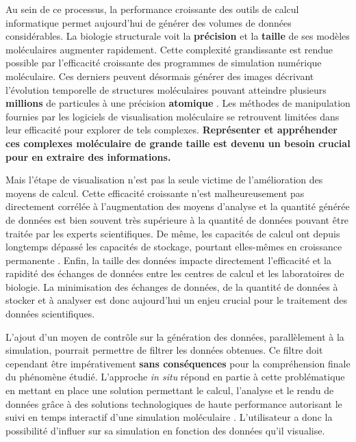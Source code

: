 Au sein de ce processus, la performance croissante des outils de calcul informatique permet aujourd'hui de générer des volumes de données considérables. La biologie structurale voit la \textbf{précision} et la \textbf{taille} de ses modèles moléculaires augmenter rapidement. Cette complexité grandissante est rendue possible par l'efficacité croissante des programmes de simulation numérique moléculaire. Ces derniers peuvent désormais générer des images décrivant l'évolution temporelle de structures moléculaires pouvant atteindre plusieurs \textbf{millions} de particules à une précision \textbf{atomique} \cite{sanbonmatsu2013molecular}. Les méthodes de manipulation fournies par les logiciels de visualisation moléculaire se retrouvent limitées dans leur efficacité pour explorer de tels complexes.
\textbf{Représenter et appréhender ces complexes moléculaire de grande taille est devenu un besoin crucial pour en extraire des informations.} 

Mais l'étape de visualisation n'est pas la seule victime de l'amélioration des moyens de calcul. Cette efficacité croissante n'est malheureusement pas directement corrélée à l'augmentation des moyens d'analyse et la quantité générée de données est bien souvent très supérieure à la quantité de données pouvant être traitée par les experts scientifiques. De même, les capacités de calcul ont depuis longtemps dépassé les capacités de stockage, pourtant elles-mêmes en croissance permanente \cite{zimmerman2014data}. Enfin, la taille des données impacte directement l'efficacité et la rapidité des échanges de données entre les centres de calcul et les laboratoires de biologie. La minimisation des échanges de données, de la quantité de données à stocker et à analyser est donc aujourd'hui un enjeu crucial pour le traitement des données scientifiques.

L'ajout d'un moyen de contrôle sur la génération des données, parallèlement à la simulation, pourrait permettre de filtrer les données obtenues. Ce filtre doit cependant être impérativement \textbf{sans conséquences} pour la compréhension finale du phénomène étudié. L'approche \textit{in situ} répond en partie à cette problématique en mettant en place une solution permettant le calcul, l'analyse et le rendu de données grâce à des solutions technologiques de haute performance autorisant le suivi en temps interactif d'une simulation moléculaire \cite{dreher_interactive_2013,kuhlen2011parallel,ma2009situ}. L'utilisateur a donc la possibilité d'influer sur sa simulation en fonction des données qu'il visualise.


